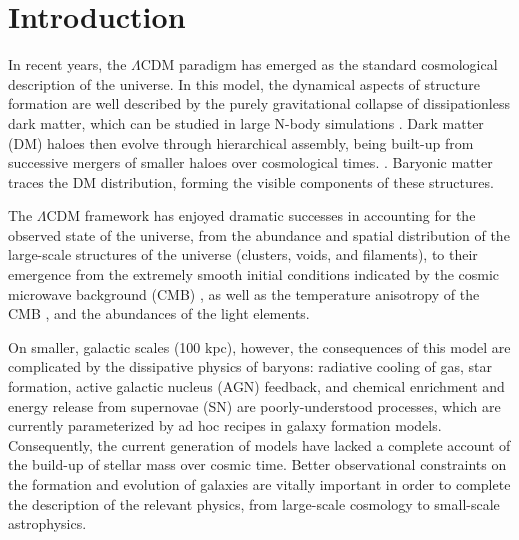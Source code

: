 \newcommand\mynote[1]{\textcolor{red}{#1}}
\newcommand\persnote[1]{\textcolor{green}{#1}}

\chapter{Introduction}

In recent years, the $\Lambda$CDM paradigm has emerged as the standard cosmological description of the universe.
In this model, the dynamical aspects of structure formation are well described by the purely gravitational collapse of dissipationless dark matter, which can be studied in large N-body simulations \citep[e.g.,][]{Springel:2005aa,Thomas:1992aa,Navarro:1995aa,Weinberg:2004aa}.
Dark matter (DM) haloes then evolve through hierarchical assembly, being built-up from successive mergers of smaller haloes over cosmological times. \citep{Gott:1975ab,Press:1974aa,White:1978aa,Blumenthal:1984aa,Davis:1985aa,White:1991aa,Barnes:1992aa,Cole:2000aa}.
Baryonic matter traces the DM distribution, forming the visible components of these structures.

The $\Lambda$CDM framework has enjoyed dramatic successes in accounting for the observed state of the universe, from the abundance and spatial distribution of the large-scale structures of the universe (clusters, voids, and filaments), to their emergence from the extremely smooth initial conditions indicated by the cosmic microwave background (CMB) \citep{Springel:2006aa}, as well as the temperature anisotropy of the CMB \citep[][and references therein]{Narlikar:2001aa}, and the abundances of the light elements.


On smaller, galactic scales (100 kpc), however, the consequences of this model are complicated by the dissipative physics of baryons:
radiative cooling of gas, star formation, active galactic nucleus (AGN) feedback, and chemical enrichment and energy release from supernovae (SN) are poorly-understood processes, which are currently parameterized by ad hoc recipes in galaxy formation models.
Consequently, the current generation of models have lacked a complete account of the build-up of stellar mass over cosmic time.
Better observational constraints on the formation and evolution of galaxies are vitally important in order to complete the description of the relevant physics, from large-scale cosmology to small-scale astrophysics.

